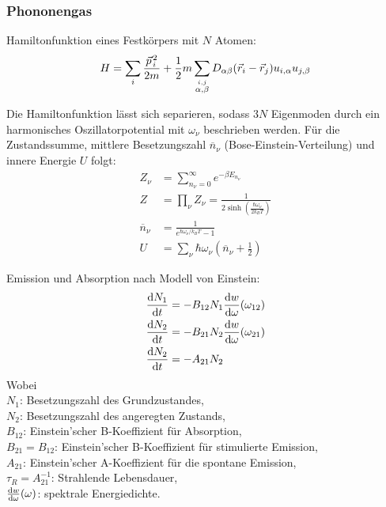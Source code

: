 \documentclass[11pt]{article}
\numberwithin{equation}{section}
\begin{document}
			\subsubsection{Phononengas}
				\noindent
				Hamiltonfunktion eines Festkörpers mit $N$ Atomen:
				\begin{equation}
					H=\sum_i \frac{\pvec{p}_i^2}{2m} + \frac{1}{2}m\sum_{\stackrel{i,j}{\alpha,\beta}} D_{\alpha\beta}(\vec{r}_i - \vec{r}_j)u_{i,\alpha}u_{j,\beta}
				\end{equation}

				\noindent
				Die Hamiltonfunktion lässt sich separieren, sodass $3N$ Eigenmoden durch ein harmonisches Oszillatorpotential mit $\omega_\nu$ beschrieben werden. Für die Zustandssumme, mittlere Besetzungszahl $\overline{n}_\nu$ (Bose-Einstein-Verteilung) und innere Energie $U$ folgt:
				\begin{equation}
					\begin{aligned}
						Z_\nu &= \sum_{n_\nu=0}^\infty e^{-\beta E_{n_\nu}} \\
						Z &= \prod_\nu Z_\nu = \frac{1}{2\sinh{\left( \frac{\hbar\omega_\nu}{2 k_B T} \right)}} \\
						\overline{n}_\nu &= \frac{1}{e^{\hbar\omega_\nu/k_B T} - 1} \\
						U &= \sum_\nu \hbar\omega_\nu \left(\overline{n}_\nu + \frac{1}{2}\right)
					\end{aligned}
				\end{equation}


				\noindent
				Emission und Absorption nach Modell von Einstein:
				\begin{equation}
					\begin{aligned}
						\frac{\mathrm{d} N_1}{\mathrm{d} t} &= -B_{12}N_1 \frac{\mathrm{d} w}{\mathrm{d} \omega}(\omega_{12}) \\
						\frac{\mathrm{d} N_2}{\mathrm{d} t} &= -B_{21}N_2 \frac{\mathrm{d} w}{\mathrm{d} \omega}(\omega_{21}) \\
						\frac{\mathrm{d} N_2}{\mathrm{d} t} &= -A_{21}N_2\\
					\end{aligned}
				\end{equation}
				Wobei \\
				\indent $N_1$: Besetzungszahl des Grundzustandes,\\
				\indent $N_2$: Besetzungszahl des angeregten Zustands,\\
				\indent $B_{12}$: Einstein'scher B-Koeffizient für Absorption,\\
				\indent $B_{21} = B_{12}$: Einstein'scher B-Koeffizient für stimulierte Emission,\\
				\indent $A_{21}$: Einstein'scher A-Koeffizient für die spontane Emission,\\
				\indent $\tau_{R}=A_{21}^{-1}$: Strahlende Lebensdauer,\\
				\indent $\frac{\mathrm{d} w}{\mathrm{d} \omega}(\omega)$: spektrale Energiedichte.\\
\end{document}
